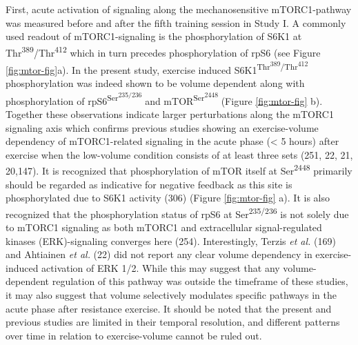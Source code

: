 \documentclass[twoside,10pt]{gihclass} %
\begin{document}
First, acute activation of signaling along the mechanosensitive mTORC1-pathway was measured before and after the fifth training session in Study I.
A commonly used readout of mTORC1-signaling is the phosphorylation of S6K1 at Thr\textsuperscript{389}/Thr\textsuperscript{412} which in turn precedes phosphorylation of rpS6 (see Figure \ref{fig:mtor-fig}a).
In the present study, exercise induced S6K1\textsuperscript{Thr\textsuperscript{389}/Thr\textsuperscript{412}} phosphorylation was indeed shown to be volume dependent along with phosphorylation of rpS6\textsuperscript{Ser\textsuperscript{235/236}} and mTOR\textsuperscript{Ser\textsuperscript{2448}} (Figure \ref{fig:mtor-fig} b).
Together these observations indicate larger perturbations along the mTORC1 signaling axis which confirms previous studies showing an exercise-volume dependency of mTORC1-related signaling in the acute phase (\textless{} 5 hours) after exercise when the low-volume condition consists of at least three sets
(251, 22, 21, 20,147).
It is recognized that phosphorylation of mTOR itself at Ser\textsuperscript{2448} primarily should be regarded as indicative for negative feedback as this site is phosphorylated due to S6K1 activity
(306) (Figure \ref{fig:mtor-fig} a).
It is also recognized that the phosphorylation status of rpS6 at Ser\textsuperscript{235/236} is not solely due to mTORC1 signaling as both mTORC1 and extracellular signal-regulated kinases (ERK)-signaling converges here
(254).
Interestingly, Terzis \emph{et al.}
(169)
and Ahtiainen \emph{et al.}
(22)
did not report any clear volume dependency in exercise-induced activation of ERK 1/2.
While this may suggest that any volume-dependent regulation of this pathway was outside the timeframe of these studies, it may also suggest that volume selectively modulates specific pathways in the acute phase after resistance exercise.
It should be noted that the present and previous studies are limited in their temporal resolution, and different patterns over time in relation to exercise-volume cannot be ruled out.
\end{document}
